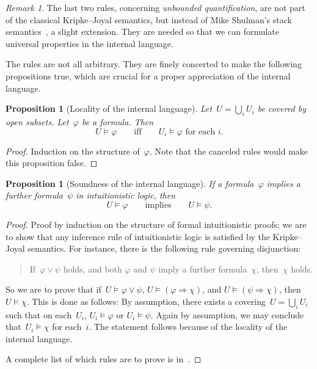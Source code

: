 \documentclass[10pt]{amsart}
\theoremstyle{definition}
\theoremstyle{plain}
\newtheorem{prop}[defn]{Proposition}
\theoremstyle{remark}
\newtheorem{rem}[defn]{Remark}
\newcommand{\?}{\,{:}\,}
\renewcommand{\_}{\mathpunct{.}\,}
\begin{document}
\begin{rem}The last two rules, concerning \emph{unbounded quantification}, are
not part of the classical Kripke--Joyal semantics, but instead of Mike
Shulman's stack semantics~\cite{shulman:stack}, a slight extension. They are
needed so that we can formulate universal properties in the internal
language.
\end{rem}

The rules are not all arbitrary. They are finely concerted to make the
following propositions true, which are crucial for a proper appreciation of the
internal language.

\begin{prop}[Locality of the internal language]
Let~$U = \bigcup_i U_i$ be covered by open subsets. Let~$\varphi$
be a formula. Then
\[ U \models \varphi \qquad\text{iff}\qquad
  \text{$U_i \models \varphi$ for each $i$}. \]
\end{prop}
\begin{proof}Induction on the structure of~$\varphi$. Note that the canceled
rules would make this proposition false.\end{proof}

\begin{prop}[Soundness of the internal language]
If a formula~$\varphi$ implies a further formula~$\psi$ in intuitionistic logic, then
\[ U \models \varphi \qquad\text{implies}\qquad
  U \models \psi. \]
\end{prop}
\begin{proof}
Proof by induction on the structure of formal intuitionistic proofs; we are to
show that any inference rule of intuitionistic logic is satisfied by the
Kripke--Joyal semantics. For instance, there is the following rule governing
disjunction:
\begin{quote}
If~$\varphi \vee \psi$ holds, and both $\varphi$ and $\psi$ imply a further
formula~$\chi$, then~$\chi$ holds.
\end{quote}
So we are to prove that if~$U \models \varphi \vee \psi$, $U \models (\varphi
\Rightarrow \chi)$, and $U \models (\psi \Rightarrow \chi)$, then $U \models \chi$.
This is done as follows: By assumption, there exists a covering~$U = \bigcup_i
U_i$ such that on each~$U_i$, $U_i \models \varphi$ or $U_i \models \psi$.
Again by assumption, we may conclude that~$U_i \models \chi$ for each~$i$. The statement
follows because of the locality of the internal language.

A complete list of which rules are to prove is
in~\cite[D1.3.1]{johnstone:elephant}.
\end{proof}
\end{document}

